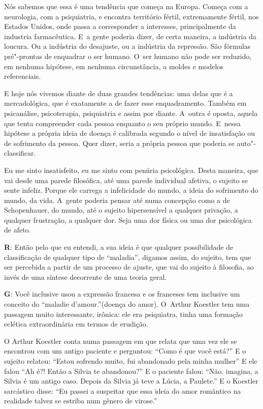  

Nós sabemos que essa é uma tendência que começa na Europa. Começa com a
neurologia, com a psiquiatria, e encontra território fértil,
extremamente fértil, nos Estados Unidos, onde passa a corresponder a
interesses, principalmente da industria farmacêutica. E~a gente poderia
dizer, de certa maneira, a indústria da loucura. Ou a indústria do
desajuste, ou a indústria da repressão. São fórmulas pré"-prontas de
enquadrar o ser humano. O~ser humano não pode ser reduzido, em nenhuma
hipótese, em nenhuma circunstância, a moldes e modelos referenciais.

 

E hoje nós vivemos diante de duas grandes tendências: uma delas que é a
mercadológica, que é exatamente a de fazer esse enquadramento. Também em
psicanálise, psicoterapia, psiquiatria e assim por diante. A~outra é
oposta, aquela que tenta compreender cada pessoa enquanto o seu próprio
mundo. E~nessa hipótese a própria ideia de doença é calibrada segundo o
nível de insatisfação ou de sofrimento da pessoa. Quer dizer, seria a
própria pessoa que poderia se auto"-classificar.

 

Eu me sinto insatisfeito, eu me sinto com penúria psicológica. Desta
maneira, que vai desde uma parede filosófica, até uma parede individual
afetiva, o sujeito se sente infeliz. Porque ele carrega a infelicidade
do mundo, a ideia do sofrimento do mundo, da vida. A~gente poderia
pensar até numa concepção como a de Schopenhauer, do mundo, até o
sujeito hipersensível a qualquer privação, a qualquer frustração, a
qualquer dor. Seja uma dor física ou uma dor psicológica de afeto.

 

\textbf{R}: Então pelo que eu entendi, a sua ideia é que qualquer
possibilidade de classificação de qualquer tipo de ``maladia'', digamos
assim, do sujeito, tem que ser percebida a partir de um processo de
ajuste, que vai do sujeito à filosofia, ao invés de uma síntese
decorrente de uma teoria geral.

 

\textbf{G}: Você inclusive usou a expressão francesa e os franceses tem
inclusive um conceito do ``maladie d'amour.''(doença do amor). O~Arthur
Koestler tem uma passagem muito interessante, irônica: ele era
psiquiatra, tinha uma formação eclética extraordinária em termos de
erudição.

O Arthur Koestler conta numa passagem em que relata que uma vez ele se
encontrou com um antigo paciente e perguntou: ``Como é que você está?''
E o sujeito relatou: ``Estou sofrendo muito, fui abandonado pela minha
mulher'' E ele falou ``Ah é?! Então a Silvia te abandonou?'' E o paciente
falou: ``Não. imagina, a Silvia é um antigo caso. Depois da Silvia já
teve a Lúcia, a Paulete.'' E o Koestler sarcástico disse: ``Eu passei a
suspeitar que essa ideia do amor romântico na realidade talvez se
estriba num gênero de virose.''

